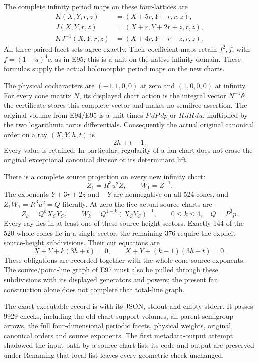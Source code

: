 The complete infinity period maps on these four-lattices are
\[
 \begin{aligned}
 K(X,Y,r,z)&=(X+5r,Y+r,r,z),\\
 J(X,Y,r,z)&=(X+r,Y+2r+z,r,z),\\
 KJ^{-1}(X,Y,r,z)&=(X+4r,Y-r-z,r,z).
 \end{aligned}
 \tag{E100.6}
\]
All three paired facet sets agree exactly. Their coefficient maps retain \(f^2,f\), with \(f=(1-u)^4c\), as in E95; this is a unit on the native infinity domain. These formulas supply the actual holomorphic period maps on the new charts.

The physical cocharacters are \((-1,1,0,0)\) at zero and \((1,0,0,0)\) at infinity. For every cone matrix \(N\), its displayed chart action is the integral vector \(N^{-1}\delta\); the certificate stores this complete vector and makes no semifree assertion. The original volume from E94/E95 is a unit times \(P\,dP\,dp\) or \(R\,dR\,du\), multiplied by the two logarithmic torus differentials. Consequently the actual original canonical order on a ray \((X,Y,h,t)\) is
\[
 2h+t-1.
 \tag{E100.7}
\]
Every value is retained. In particular, regularity of a fan chart does not erase the original exceptional canonical divisor or its determinant lift.

There is a complete source projection on every new infinity chart:
\[
 Z_1=R^3u^2 Z,\qquad W_1=Z^{-1}.
 \tag{E100.8}
\]
The exponents \(Y+3r+2z\) and \(-Y\) are nonnegative on all 524 cones, and \(Z_1W_1=R^3u^2=Q\) literally. At zero the five actual source charts are
\[
 Z_k=Q^kX_CY_C,\qquad
 W_k=Q^{1-k}(X_CY_C)^{-1},\qquad 0\leq k\leq4,
 \quad Q=P^3p.
 \tag{E100.9}
\]
Every ray lies in at least one of these source-height sectors. Exactly 144 of the 520 whole cones lie in a single sector; the remaining 376 require the explicit source-height subdivisions. Their cut equations are
\[
 X+Y+k(3h+t)=0,\qquad
 X+Y+(k-1)(3h+t)=0.
 \tag{E100.10}
\]
These obligations are recorded together with the whole-cone source exponents. The source/point-line graph of E97 must also be pulled through these subdivisions with its displayed generators and powers; the present fan construction alone does not complete that total-line graph.

The exact executable record is  with its JSON, stdout and empty stderr. It passes 9929 checks, including the old-chart support volumes, all parent semigroup arrows, the full four-dimensional periodic facets, physical weights, original canonical orders and source exponents. The first metadata-output attempt shadowed the input path by a source-chart list; its code and output are preserved under  Renaming that local list leaves every geometric check unchanged.

